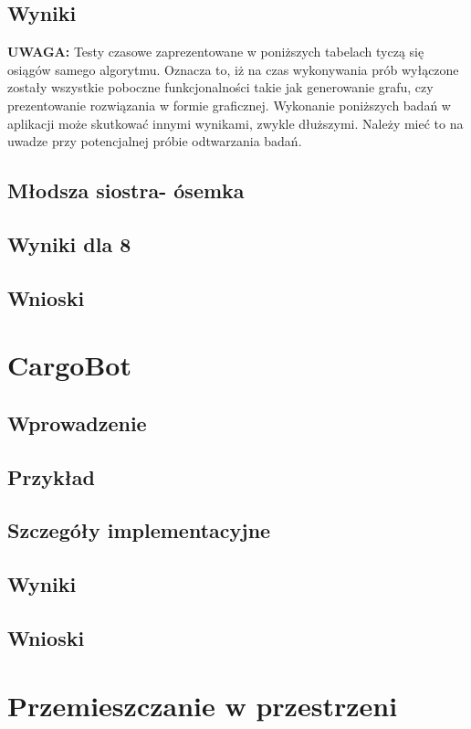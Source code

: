     \subsection{Wyniki}

    \textbf{UWAGA:} Testy czasowe zaprezentowane w poniższych tabelach tyczą się osiągów samego algorytmu. Oznacza to, iż na czas wykonywania prób
    wyłączone zostały wszystkie poboczne funkcjonalności takie jak generowanie grafu, czy prezentowanie rozwiązania w formie graficznej. 
    Wykonanie poniższych badań w aplikacji może skutkować innymi wynikami, zwykle dłuższymi. Należy mieć to na uwadze przy potencjalnej 
    próbie odtwarzania badań.



    \subsection{Młodsza siostra- ósemka}

    \subsection{Wyniki dla 8}
    \subsection{Wnioski}
\section{CargoBot}
    \subsection{Wprowadzenie}
    \subsection{Przykład}
    \subsection{Szczegóły implementacyjne}
    \subsection{Wyniki}
    \subsection{Wnioski}
\section{Przemieszczanie w przestrzeni}
